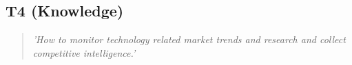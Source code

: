 \subsection*{T4 (Knowledge)}

  \begin{quote}
    \textit{'How to monitor technology related
    market trends and research and collect competitive
    intelligence.'}
  \end{quote}

\newpage